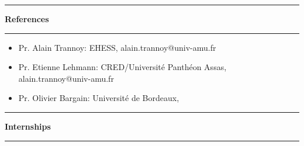 \documentclass[a4paper,11pt]{article} %
\newcommand{\titre}[1]{%
	\begin{center}
	\rule{\textwidth}{1pt}
	\par\vspace{0.1cm}
        \textbf{\large #1}
	\par\rule{\textwidth}{1pt}
	\end{center}
	}
\begin{document}
\begin{itemize}

  


\end{itemize}

\newpage

\titre{References}
\begin{itemize}






\item{Pr. Alain Trannoy: EHESS, alain.trannoy@univ-amu.fr} 
\item{Pr. Etienne Lehmann: CRED/Université Panthéon Assas, alain.trannoy@univ-amu.fr} 
\item{Pr. Olivier Bargain: Université de Bordeaux, } 
\end{itemize}



\titre{Internships}
\end{document}
